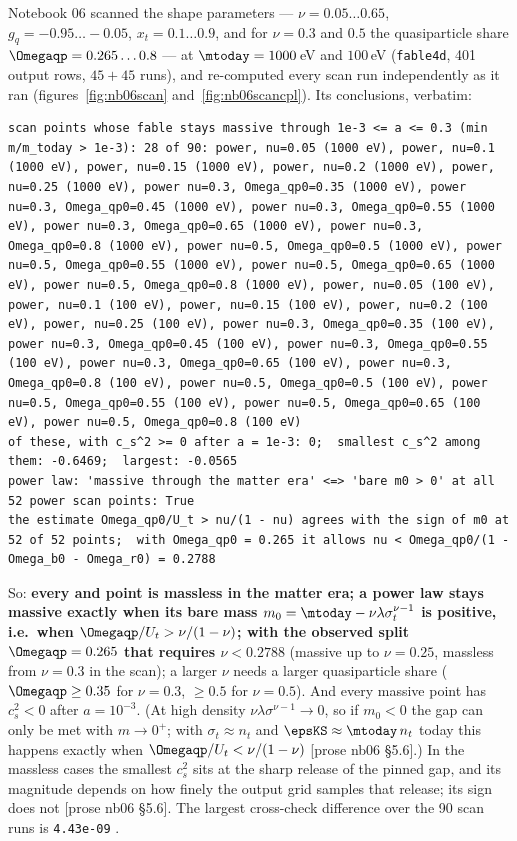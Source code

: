 Notebook 06 scanned the shape parameters ---  $\nu=0.05\dots0.65$, 
$g_q=-0.95\dots-0.05$,  $x_t=0.1\dots0.9$, and for  $\nu=0.3$ and $0.5$ the
quasiparticle share $\Omegaqp=0.265\dots0.8$ --- at $\mtoday=1000$\,eV and $100$\,eV (\texttt{fable4d}, 401
output rows, $45+45$ runs), and re-computed every scan run independently as it ran 
(figures~\ref{fig:nb06scan} and~\ref{fig:nb06scancpl}). Its conclusions, verbatim:
\begin{Verbatim}[fontsize=\scriptsize]
scan points whose fable stays massive through 1e-3 <= a <= 0.3 (min m/m_today > 1e-3): 28 of 90: power, nu=0.05 (1000 eV), power, nu=0.1 (1000 eV), power, nu=0.15 (1000 eV), power, nu=0.2 (1000 eV), power, nu=0.25 (1000 eV), power nu=0.3, Omega_qp0=0.35 (1000 eV), power nu=0.3, Omega_qp0=0.45 (1000 eV), power nu=0.3, Omega_qp0=0.55 (1000 eV), power nu=0.3, Omega_qp0=0.65 (1000 eV), power nu=0.3, Omega_qp0=0.8 (1000 eV), power nu=0.5, Omega_qp0=0.5 (1000 eV), power nu=0.5, Omega_qp0=0.55 (1000 eV), power nu=0.5, Omega_qp0=0.65 (1000 eV), power nu=0.5, Omega_qp0=0.8 (1000 eV), power, nu=0.05 (100 eV), power, nu=0.1 (100 eV), power, nu=0.15 (100 eV), power, nu=0.2 (100 eV), power, nu=0.25 (100 eV), power nu=0.3, Omega_qp0=0.35 (100 eV), power nu=0.3, Omega_qp0=0.45 (100 eV), power nu=0.3, Omega_qp0=0.55 (100 eV), power nu=0.3, Omega_qp0=0.65 (100 eV), power nu=0.3, Omega_qp0=0.8 (100 eV), power nu=0.5, Omega_qp0=0.5 (100 eV), power nu=0.5, Omega_qp0=0.55 (100 eV), power nu=0.5, Omega_qp0=0.65 (100 eV), power nu=0.5, Omega_qp0=0.8 (100 eV)
of these, with c_s^2 >= 0 after a = 1e-3: 0;  smallest c_s^2 among them: -0.6469;  largest: -0.0565
power law: 'massive through the matter era' <=> 'bare m0 > 0' at all 52 power scan points: True
the estimate Omega_qp0/U_t > nu/(1 - nu) agrees with the sign of m0 at 52 of 52 points;  with Omega_qp0 = 0.265 it allows nu < Omega_qp0/(1 - Omega_b0 - Omega_r0) = 0.2788
\end{Verbatim}
So: \textbf{every  and  point is massless in the matter era; a power law
stays massive exactly when its bare mass $m_0=\mtoday-\nu\lambda\sigma_t^{\nu-1}$ is positive, i.e.\ when
$\Omegaqp/U_t>\nu/(1-\nu)$; with the observed split $\Omegaqp=0.265$ that requires $\nu<0.2788$} (massive up to
$\nu=0.25$, massless from $\nu=0.3$ in the scan); a larger $\nu$ needs a larger quasiparticle share
($\Omegaqp\geq0.35$ for $\nu=0.3$, $\geq0.5$ for $\nu=0.5$). And every massive point has $c_s^2<0$ after
$a=10^{-3}$. (At high density $\nu\lambda\sigma^{\nu-1}\to0$, so if $m_0<0$ the gap can only be met with $m\to0^+$;
with $\sigma_t\approx n_t$ and $\epsKS\approx\mtoday\,n_t$ today this happens exactly when
$\Omegaqp/U_t<\nu/(1-\nu)$ [prose nb06 \S5.6].) In the massless cases the smallest $c_s^2$ sits at the sharp
release of the pinned gap, and its magnitude depends on how finely the output grid samples that release; its
sign does not [prose nb06 \S5.6]. The largest cross-check difference over the 90 scan runs is
\texttt{4.43e-09} .

